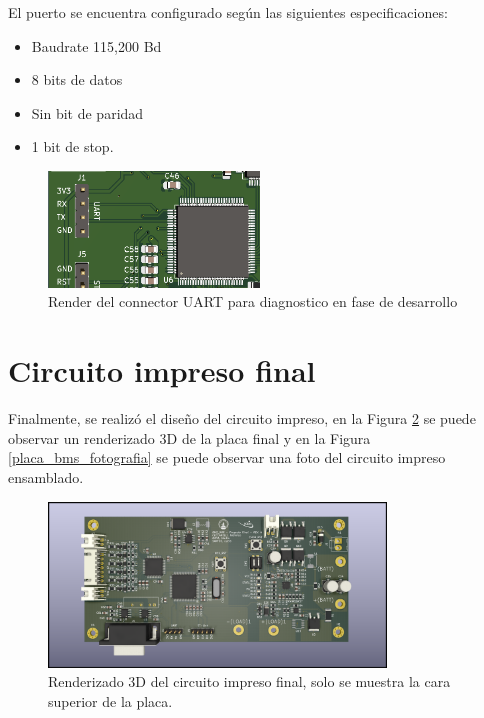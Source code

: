 \documentclass[10pt, a4paper]{report}
\begin{document}
El puerto se encuentra configurado según las siguientes especificaciones:
\begin{itemize}
	\item Baudrate 115,200 Bd
	\item 8 bits de datos
	\item Sin bit de paridad
	\item 1 bit de stop.
\end{itemize}

\begin{figure}[h!]
	\begin{center}
		\includegraphics[width=0.5\textwidth]{connector_UART.png}
		\caption{Render del connector UART para diagnostico en fase de desarrollo}
		\label{UART_Connector}
	\end{center}
\end{figure}
\FloatBarrier

\section{Circuito impreso final}

Finalmente, se realiz\'o el diseño del circuito impreso, en la Figura
\ref{render_pcb} se puede observar un renderizado 3D de la placa final y en la
Figura \ref{placa_bms_fotografia} se puede observar una foto del circuito impreso
ensamblado. 

\begin{figure}[h!]
    \begin{center}
        \includegraphics[width=0.8\textwidth]{render_pcb.png}
        \caption{Renderizado 3D del circuito impreso final, solo se muestra la
        cara superior de la placa.}
        \label{render_pcb}
    \end{center}
\end{figure}
\end{document}
